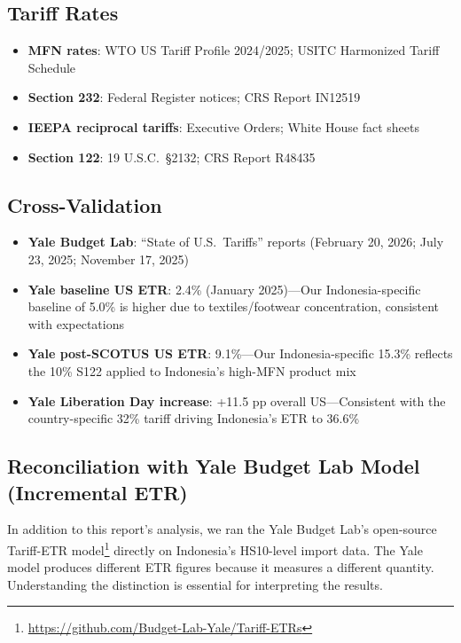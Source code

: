 \documentclass[12pt,a4paper]{article}
\begin{document}
\subsection*{Tariff Rates}
\begin{itemize}
    \item \textbf{MFN rates}: WTO US Tariff Profile 2024/2025; USITC Harmonized Tariff Schedule
    \item \textbf{Section 232}: Federal Register notices; CRS Report IN12519
    \item \textbf{IEEPA reciprocal tariffs}: Executive Orders; White House fact sheets
    \item \textbf{Section 122}: 19 U.S.C.\ \S 2132; CRS Report R48435
\end{itemize}

\subsection*{Cross-Validation}
\begin{itemize}
    \item \textbf{Yale Budget Lab}: ``State of U.S.\ Tariffs'' reports (February 20, 2026; July 23, 2025; November 17, 2025)
    \item \textbf{Yale baseline US ETR}: 2.4\% (January 2025)---Our Indonesia-specific baseline of 5.0\% is higher due to textiles/footwear concentration, consistent with expectations
    \item \textbf{Yale post-SCOTUS US ETR}: 9.1\%---Our Indonesia-specific 15.3\% reflects the 10\% S122 applied to Indonesia's high-MFN product mix
    \item \textbf{Yale Liberation Day increase}: +11.5 pp overall US---Consistent with the country-specific 32\% tariff driving Indonesia's ETR to 36.6\%
\end{itemize}

\subsection*{Reconciliation with Yale Budget Lab Model (Incremental ETR)}

In addition to this report's analysis, we ran the Yale Budget Lab's open-source Tariff-ETR model\footnote{\url{https://github.com/Budget-Lab-Yale/Tariff-ETRs}} directly on Indonesia's HS10-level import data. The Yale model produces different ETR figures because it measures a different quantity. Understanding the distinction is essential for interpreting the results.
\end{document}
